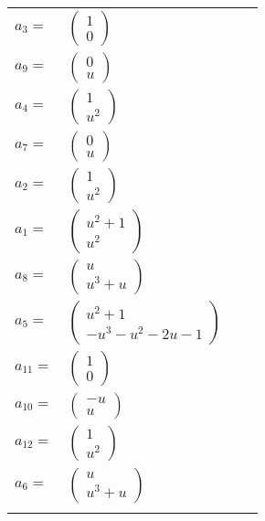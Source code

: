 \documentclass[1p]{elsarticle_modified}
\theoremstyle{definition}
\begin{document}
\begin{tabular}{m{7pt} m{180pt} m{7pt} m{180pt} }
\flushright $a_{3}=$&$\begin{pmatrix}1\\0\end{pmatrix}$ \\
\flushright $a_{9}=$&$\begin{pmatrix}0\\u\end{pmatrix}$ \\
\flushright $a_{4}=$&$\begin{pmatrix}1\\u^2\end{pmatrix}$ \\
\flushright $a_{7}=$&$\begin{pmatrix}0\\u\end{pmatrix}$ \\
\flushright $a_{2}=$&$\begin{pmatrix}1\\u^2\end{pmatrix}$ \\
\flushright $a_{1}=$&$\begin{pmatrix}u^2+1\\u^2\end{pmatrix}$ \\
\flushright $a_{8}=$&$\begin{pmatrix}u\\u^3+u\end{pmatrix}$ \\
\flushright $a_{5}=$&$\begin{pmatrix}u^2+1\\- u^3- u^2-2 u-1\end{pmatrix}$ \\
\flushright $a_{11}=$&$\begin{pmatrix}1\\0\end{pmatrix}$ \\
\flushright $a_{10}=$&$\begin{pmatrix}- u\\u\end{pmatrix}$ \\
\flushright $a_{12}=$&$\begin{pmatrix}1\\u^2\end{pmatrix}$ \\
\flushright $a_{6}=$&$\begin{pmatrix}u\\u^3+u\end{pmatrix}$\\&\end{tabular}
\end{document}
